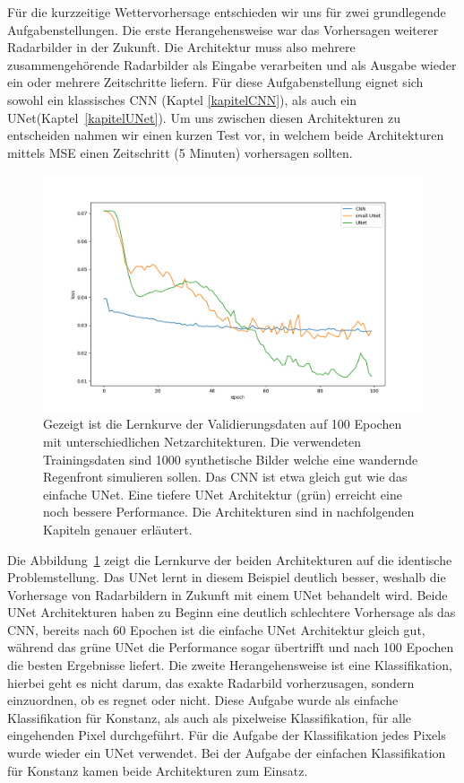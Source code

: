 Für die kurzzeitige Wettervorhersage entschieden wir uns für zwei grundlegende Aufgabenstellungen. Die erste Herangehensweise war das Vorhersagen weiterer Radarbilder in der Zukunft. Die Architektur muss also mehrere zusammengehörende Radarbilder als Eingabe verarbeiten und als Ausgabe wieder ein oder mehrere Zeitschritte liefern. Für diese Aufgabenstellung eignet sich sowohl ein klassisches CNN (Kaptel \ref{kapitelCNN}), als auch ein UNet(Kaptel~\ref{kapitelUNet}). Um uns zwischen diesen Architekturen zu entscheiden nahmen wir einen kurzen Test vor, in welchem beide Architekturen mittels MSE einen Zeitschritt (5 Minuten) vorhersagen sollten.
\begin{figure}[h]
	\centering
	\includegraphics[width=\linewidth]{pics/Syntetische_Daten_CNN_UNet.png}
	\caption[Lernkurven verschiedener Architekturen auf synthetischen Daten]{Gezeigt ist die Lernkurve der Validierungsdaten auf 100 Epochen mit unterschiedlichen Netzarchitekturen. Die verwendeten Trainingsdaten sind 1000 synthetische Bilder welche eine wandernde Regenfront simulieren sollen. Das CNN ist etwa gleich gut wie das einfache UNet. Eine tiefere UNet Architektur (grün) erreicht eine noch bessere Performance. Die Architekturen sind in nachfolgenden Kapiteln genauer erläutert. }
	\label{imgCNNUNet}
\end{figure}

Die Abbildung~\ref{imgCNNUNet} zeigt die Lernkurve der beiden Architekturen auf die identische Problemstellung. Das UNet lernt in diesem Beispiel deutlich besser, weshalb die Vorhersage von Radarbildern in Zukunft mit einem UNet behandelt wird. Beide UNet Architekturen haben zu Beginn eine deutlich schlechtere Vorhersage als das CNN, bereits nach 60 Epochen ist die einfache UNet Architektur gleich gut, während das grüne UNet die Performance sogar übertrifft und nach 100 Epochen die besten Ergebnisse liefert.
\newline
Die zweite Herangehensweise ist eine Klassifikation, hierbei geht es nicht darum, das exakte Radarbild vorherzusagen, sondern einzuordnen, ob es regnet oder nicht. Diese Aufgabe wurde als einfache Klassifikation für Konstanz, als auch als pixelweise Klassifikation, für alle eingehenden Pixel durchgeführt. Für die Aufgabe der Klassifikation jedes Pixels wurde wieder ein UNet verwendet. Bei der Aufgabe der einfachen Klassifikation für Konstanz kamen beide Architekturen zum Einsatz.

